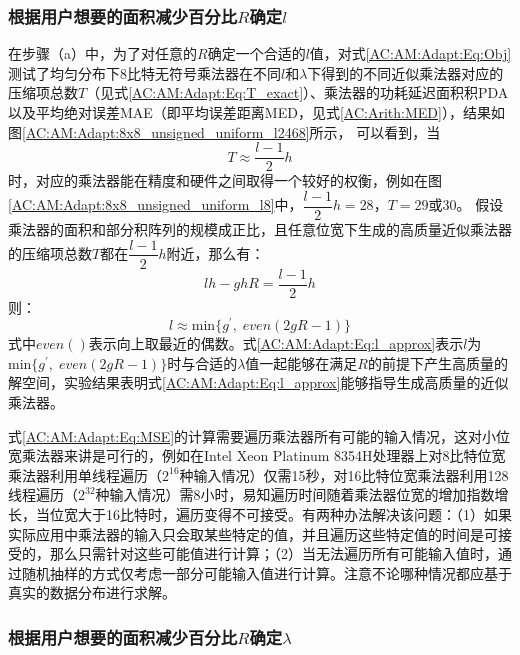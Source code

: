 \subsubsection{根据用户想要的面积减少百分比$R$确定$l$}

在步骤（a）中，为了对任意的$R$确定一个合适的$l$值，对式\eqref{AC:AM:Adapt:Eq:Obj}测试了均匀分布下8比特无符号乘法器在不同$l$和$\lambda$下得到的不同近似乘法器对应的压缩项总数$T$（见式\eqref{AC:AM:Adapt:Eq:T_exact}）、乘法器的功耗延迟面积积PDA以及平均绝对误差MAE（即平均误差距离MED，见式\eqref{AC:Arith:MED}），结果如图\ref{AC:AM:Adapt:8x8_unsigned_uniform_l2468}所示，
可以看到，当
\begin{equation}
    T \approx \frac{l-1}{2} h
\label{AC:AM:Adapt:Eq:T_approx}
\end{equation}
时，对应的乘法器能在精度和硬件之间取得一个较好的权衡，例如在图\ref{AC:AM:Adapt:8x8_unsigned_uniform_l8}中，$\dfrac{l-1}{2} h=28$，$T=29\text{或}30$。
假设乘法器的面积和部分积阵列的规模成正比，且任意位宽下生成的高质量近似乘法器的压缩项总数$T$都在$\dfrac{l-1}{2} h$附近，那么有：
\begin{equation}
    lh - ghR = \frac{l-1}{2} h
\end{equation}
则：
\begin{equation}
    l \approx \text{min} \{g^{\prime}, \; even ( 2gR-1 ) \}
\label{AC:AM:Adapt:Eq:l_approx}
\end{equation}
式中$even()$表示向上取最近的偶数。式\eqref{AC:AM:Adapt:Eq:l_approx}表示$l$为$\text{min} \{g^{\prime}, \; even ( 2gR-1 ) \}$时与合适的$\lambda$值一起能够在满足$R$的前提下产生高质量的解空间，实验结果表明式\eqref{AC:AM:Adapt:Eq:l_approx}能够指导生成高质量的近似乘法器。

式\eqref{AC:AM:Adapt:Eq:MSE}的计算需要遍历乘法器所有可能的输入情况，这对小位宽乘法器来讲是可行的，例如在Intel Xeon Platinum 8354H处理器上对8比特位宽乘法器利用单线程遍历（$2^{16}$种输入情况）仅需15秒，对16比特位宽乘法器利用128线程遍历（$2^{32}$种输入情况）需8小时，易知遍历时间随着乘法器位宽的增加指数增长，当位宽大于16比特时，遍历变得不可接受。有两种办法解决该问题：（1）如果实际应用中乘法器的输入只会取某些特定的值，并且遍历这些特定值的时间是可接受的，那么只需针对这些可能值进行计算；（2）当无法遍历所有可能输入值时，通过随机抽样的方式仅考虑一部分可能输入值进行计算。注意不论哪种情况都应基于真实的数据分布进行求解。

\subsubsection{根据用户想要的面积减少百分比$R$确定$\lambda$}

